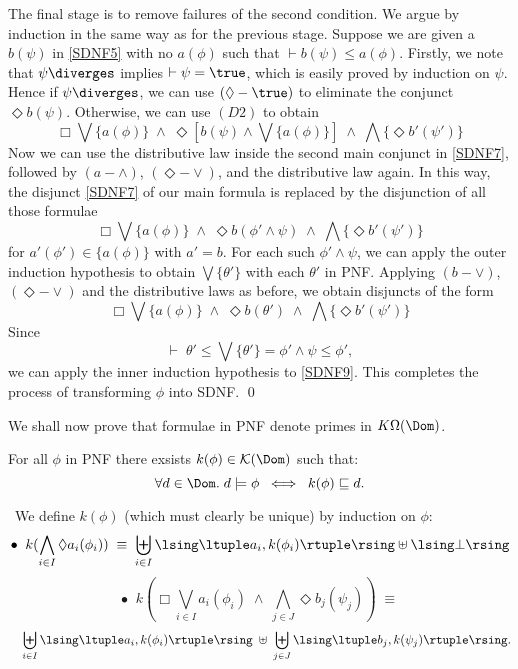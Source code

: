 The final stage is to remove failures of the second condition.
We argue by induction in the same way as for the previous stage.
Suppose we are given a $b(\psi )$ in \ref{SDNF5} with no $a(\phi )$ such that $\vdash  b(\psi ) \leq a(\phi )$.
Firstly, we note that
$\psi \diverges$  implies $\vdash  \psi = \true$, 
which is easily proved by induction on $\psi$.
Hence if $\psi \diverges$, we can use $({\Diamond}-{\true})$ to eliminate the conjunct $\Diamond b(\psi )$.
Otherwise, we can use $(D2)$ to obtain
\begin{equation} 
\label{SDNF7}
\Box \bigvee \{ a(\phi ) \} \; \wedge \; \Diamond [ b(\psi ) \wedge \bigvee \{ a(\phi ) \} ] \; \wedge \; \bigwedge \{ \Diamond b' (\psi' ) \}
\end{equation}
Now we can use the distributive law inside the second main conjunct in \ref{SDNF7}, followed by $(a-{\wedge})$, $({\Diamond}-{\vee})$, and the distributive law again.
In this way, the disjunct \ref{SDNF7} of our main formula is replaced by the disjunction of all those formulae
\begin{equation} 
\label{SDNF8}
\Box \bigvee \{ a(\phi ) \} \; \wedge \; \Diamond b(\phi' \wedge \psi ) \; \wedge \; \bigwedge \{ \Diamond b' ( \psi' ) \}
\end{equation}
for $a'(\phi' ) \in \{ a(\phi ) \}$ with $a' = b$.
For each such $\phi' \wedge \psi$, we can apply the outer induction hypothesis to obtain $\bigvee \{ \theta' \}$ with each $\theta'$ in PNF.
Applying $(b-{\vee})$, $({\Diamond}-{\vee})$ and the distributive laws as before, we obtain disjuncts of the form
\begin{equation} 
\label{SDNF9}
\Box \bigvee \{ a(\phi ) \} \; \wedge \; \Diamond b(\theta' ) \; \wedge \;  \bigwedge \{ \Diamond b' ( \psi' ) \}
\end{equation}
Since
\[ \vdash \; \theta' \leq \bigvee \{ \theta' \} = \phi' \wedge \psi \leq \phi' , \]
we can apply the inner induction hypothesis to \ref{SDNF9}.
This completes the process of transforming $\phi$ into SDNF. \qed

We shall now prove that formulae in PNF denote primes in $K \Omega (\Dom )$.
\begin{proposition}
\label{psoun}
For all $\phi$ in PNF there exsists $k(\phi ) \in {\cal K}(\Dom )$ such that:
\[ \forall d \in \Dom . \; d \models \phi \;\; \Longleftrightarrow \;\; k(\phi ) \sqsubseteq d . \]
\end{proposition}

\proof\ We define $k(\phi )$ (which must clearly be unique) by induction on $\phi$:
\[ \bullet \;\; k(\bigwedge_{i \in I} \Diamond a_{i}(\phi_{i} )) \; \equiv \; \biguplus_{i \in I} \lsing \ltuple a_{i} , k(\phi_{i}) \rtuple \rsing \uplus \lsing \bot \rsing \]
\[ \bullet \;\; k(\Box \bigvee_{i \in I} a_{i}(\phi_{i}) \; \wedge \; \bigwedge_{j \in J} \Diamond b_{j}(\psi_{j})) \; \equiv \]
\[  \;\;\;\; \biguplus_{i \in I} \lsing \ltuple a_{i}, k(\phi_{i} ) \rtuple \rsing \; \uplus \; \biguplus_{j \in J} \lsing \ltuple b_{j}, k(\psi_{j}) \rtuple \rsing . \]

